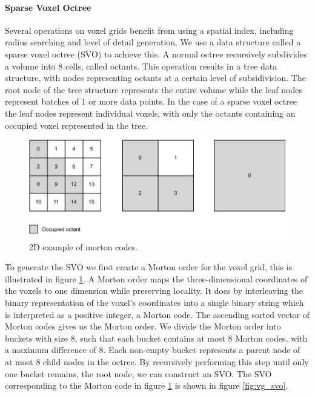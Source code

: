 \paragraph{Sparse Voxel Octree}
Several operations on voxel grids benefit from using a spatial index, including radius searching and level of detail generation. We use a data structure called a sparse voxel octree (SVO) to achieve this. A normal octree recursively subdivides a volume into 8 cells, called octants. This operation results in a tree data structure, with nodes representing octants at a certain level of subsidivision. The root node of the tree structure represents the entire volume while the leaf nodes represent batches of 1 or more data points. In the case of a sparse voxel octree the leaf nodes represent individual voxels, with only the octants containing an occupied voxel represented in the tree. 

\begin{figure}[h]
    \centering
    \includegraphics*[width=.7\textwidth]{./fig/morton_code.pdf}
    \caption{2D example of morton codes.}
    \label{fig:vg_morton}
\end{figure}

To generate the SVO we first create a Morton order for the voxel grid, this is illustrated in figure \ref{fig:vg_morton}. A Morton order maps the three-dimensional coordinates of the voxels to one dimension while preserving locality. It does by interleaving the binary representation of the voxel's coordinates into a single binary string which is interpreted as a positive integer, a Morton code. The ascending sorted vector of Morton codes gives us the Morton order. We divide the Morton order into buckets with size 8, such that each bucket contains at most 8 Morton codes, with a maximum difference of 8. Each non-empty bucket represents a parent node of at most 8 child nodes in the octree. By recursively performing this step until only one bucket remains, the root node, we can construct an SVO. The SVO corresponding to the Morton code in figure \ref{fig:vg_morton} is shown in figure \ref{fig:vg_svo}.

